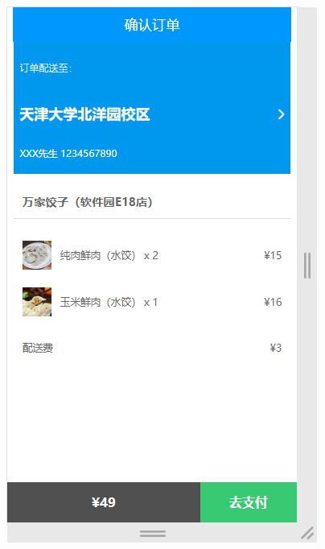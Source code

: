 \begin{figure}[H]
{\begin{minipage}[t]{0.22\linewidth}
            \includegraphics[scale=0.3]{figures/2.2.4.png}\\
        \end{minipage}
    }
\end{figure}
